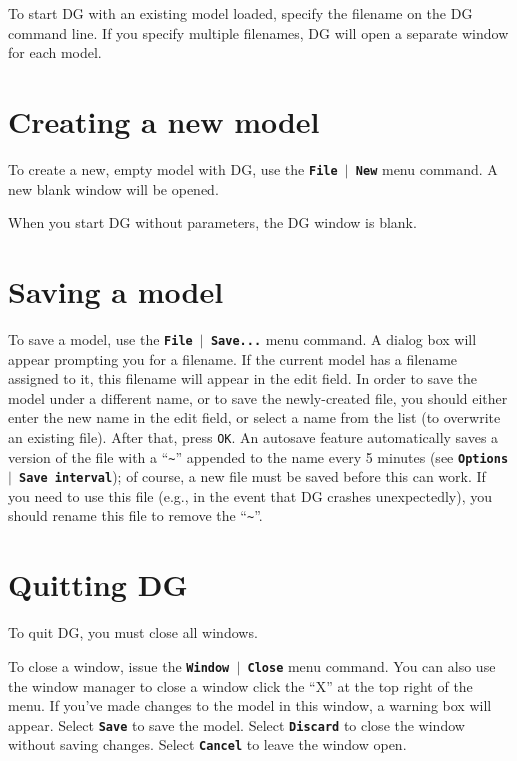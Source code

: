 \documentclass[12pt]{report}
\begin{document}
To start DG with an existing model loaded, specify the filename on the
DG command line. If you specify multiple filenames, DG will open a
separate window for each model.

\section{Creating a new model}

To create a new, empty model with DG, use the
\textbf{\texttt{File  \begin{math}\vert{}\end{math}  New}} menu command. A
new blank window will be opened.

When you start DG without parameters, the DG window is blank.

\section{Saving a model}

To save a model, use the
\textbf{\texttt{File  \begin{math}\vert{}\end{math}  Save...}} menu
command. A dialog box will appear prompting you for a filename. If the
current model has a filename assigned to it, this filename will appear
in the edit field. In order to save the model under a different name,
or to save the newly-created file, you should either enter the new name
in the edit field, or select a name from the list (to overwrite an
existing file). After that, press \texttt{OK}.  An autosave feature
automatically saves a version of the file with a ``\verb+~+'' 
appended to the
name every 5 minutes (see 
\textbf{\texttt{Options  \begin{math}\vert{}\end{math}  Save interval}});
of course, a new file must
be saved before this can work.  If you need to use this file (e.g.,
in the event that DG crashes unexpectedly), you should rename this
file to remove the ``\verb+~+''.

\section{Quitting DG}

To quit DG, you must close all windows.

To close a window, issue the
\textbf{\texttt{Window  \begin{math}\vert{}\end{math}  Close}} menu
command. You can also use the window manager to close a window
click the ``X'' at the top right of the menu. 
If you've
made changes to the model in this window, a warning box will appear.
Select \textbf{\texttt{Save}} to save the model. Select
\textbf{\texttt{Discard}} to close the window without saving changes.
Select \textbf{\texttt{Cancel}} to leave the window open.
\end{document}
